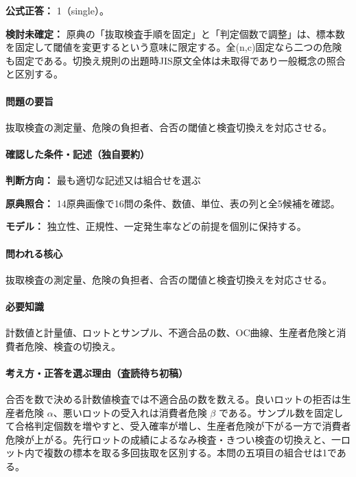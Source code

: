 \textbf{公式正答：} 1（single）。

\par\textbf{検討未確定：} 原典の「抜取検査手順を固定」と「判定個数で調整」は、標本数を固定して閾値を変更するという意味に限定する。全(n,c)固定なら二つの危険も固定である。切換え規則の出題時JIS原文全体は未取得であり一般概念の照合と区別する。

\paragraph{問題の要旨} 抜取検査の測定量、危険の負担者、合否の閾値と検査切換えを対応させる。

\paragraph{確認した条件・記述（独自要約）}\mbox{}\par

\noindent\textbf{判断方向：} 最も適切な記述又は組合せを選ぶ\par

\noindent\textbf{原典照合：} 14原典画像で16問の条件、数値、単位、表の列と全5候補を確認。\par

\noindent\textbf{モデル：} 独立性、正規性、一定発生率などの前提を個別に保持する。\par

\paragraph{問われる核心} 抜取検査の測定量、危険の負担者、合否の閾値と検査切換えを対応させる。

\paragraph{必要知識} 計数値と計量値、ロットとサンプル、不適合品の数、OC曲線、生産者危険と消費者危険、検査の切換え。

\paragraph{考え方・正答を選ぶ理由（査読待ち初稿）} 合否を数で決める計数値検査では不適合品の数を数える。良いロットの拒否は生産者危険 \(\alpha\)、悪いロットの受入れは消費者危険 \(\beta\) である。サンプル数を固定して合格判定個数を増やすと、受入確率が増し、生産者危険が下がる一方で消費者危険が上がる。先行ロットの成績によるなみ検査・きつい検査の切換えと、一ロット内で複数の標本を取る多回抜取を区別する。本問の五項目の組合せは1である。


